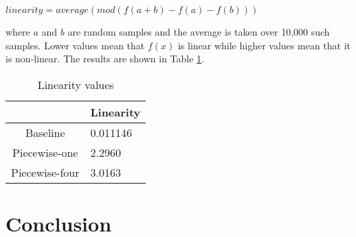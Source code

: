 \documentclass[11pt]{article}
\begin{document}
$linearity = average(mod(f(a + b) - f(a) - f(b)))$

where $a$ and $b$ are random samples and the average is taken over 10,000 such samples. Lower values mean that $f(x)$ is linear while higher values mean that it is non-linear. The results are shown in Table \ref{linearity-table}.

\begin{table}[h]
  \begin{center}
  \begin{tabular}{|c|l|}
  \hline
   & Linearity \\
  \hline
  Baseline & 0.011146 \\
  \hline
  Piecewise-one & 2.2960 \\
  \hline
  Piecewise-four & 3.0163 \\
  \hline
  \end{tabular}
  \end{center}
  \caption{ Linearity values}
  \label{linearity-table}
\end{table}

\section{Conclusion}





\end{document}
